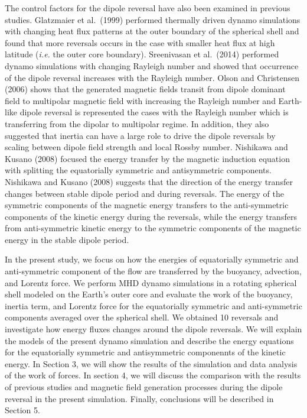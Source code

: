 The control factors for the dipole reversal have also been %
{\color{red} examined in} previous studies. 
Glatzmaier et al.\ (1999) \cite{Glatzmaier:1999} performed thermally driven dynamo simulations with changing heat flux patterns at the outer boundary of the spherical shell and found that more reversals occurs in the case with smaller heat flux at high latitude ({\it i.e.} the outer core boundary). 
Sreenivasan et al.\ (2014) \cite{Sreenivasan:2014} performed dynamo simulations with changing Rayleigh number and showed that occurrence of the dipole reversal increases with the Rayleigh number. 
Olson and Christensen (2006) \cite{Olson:2006} shows that the generated magnetic fields transit from dipole dominant field to multipolar magnetic field with increasing the Rayleigh number and Earth-like dipole reversal is represented the cases with the Rayleigh number which is transferring from the dipolar to multipolar regime. 
In addition, they also suggested that inertia can have a large role to drive the dipole reversals by scaling between dipole field strength and local Rossby number. 
Nishikawa and Kusano (2008) \cite{Nishikawa:2008} focused the energy transfer by the magnetic induction equation with splitting the equatorially symmetric and antisymmetric components. 
Nishikawa and Kusano (2008) suggests that the direction of the energy transfer changes between stable dipole period and during reversals. 
The energy of the symmetric components of the magnetic energy transfers to the anti-symmetric components of the kinetic energy during the reversals, while the energy transfers from anti-symmetric kinetic energy to the symmetric components of the magnetic energy in the stable dipole period.

In the present study, we focus on how the energies of equatorially symmetric and anti-symmetric component of the flow are transferred by the buoyancy, advection, and Lorentz force. 
We perform MHD dynamo simulations in a rotating spherical shell modeled on the Earth's outer core and evaluate the work of the buoyancy, inertia term, and Lorentz force for the equatorially symmetric and anti-symmetric components averaged over the spherical shell. 
We obtained 10 reversals and investigate how energy fluxes changes around the dipole reversals. We will explain the models of the present dynamo simulation and describe the energy equations for the equatorially symmetric and antisymmetric componennts of the kinetic energy. 
In Section 3, we will show the results of the simulation and data analysis of the work of forces. In section 4, we will discuss the comparison with the results of previous studies and magnetic field generation processes during the dipole reversal in the present simulation. 
Finally, conclusions will be described in Section 5.
